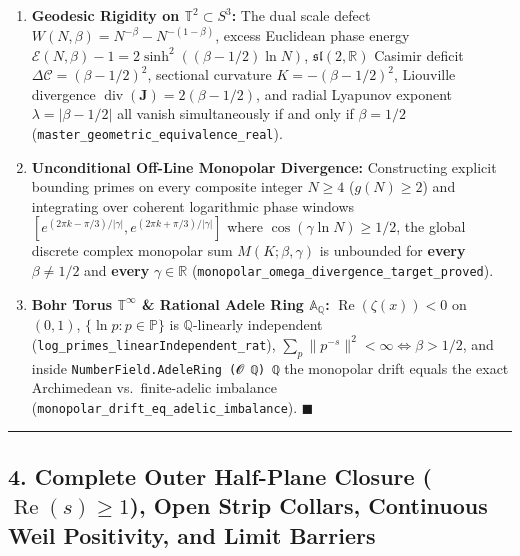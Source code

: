 \documentclass[
  11pt,
]{article}
\providecommand{\tightlist}{%
  \setlength{\itemsep}{0pt}\setlength{\parskip}{0pt}}
\begin{document}
\begin{enumerate}
\def\labelenumi{\arabic{enumi}.}
\tightlist
\item
  \textbf{Geodesic Rigidity on \(\mathbb{T}^2 \subset S^3\):} The dual
  scale defect \(W(N,\beta) = N^{-\beta} - N^{-(1-\beta)}\), excess
  Euclidean phase energy
  \(\mathcal{E}(N,\beta) - 1 = 2\sinh^2((\beta-1/2)\ln N)\),
  \(\mathfrak{sl}(2,\mathbb{R})\) Casimir deficit
  \(\Delta\mathcal{C} = (\beta-1/2)^2\), sectional curvature
  \(K = -(\beta-1/2)^2\), Liouville divergence
  \(\operatorname{div}(\mathbf{J}) = 2(\beta-1/2)\), and radial Lyapunov
  exponent \(\lambda = |\beta-1/2|\) all vanish simultaneously if and
  only if \(\beta = 1/2\)
  (\texttt{master\_geometric\_equivalence\_real}).
\item
  \textbf{Unconditional Off-Line Monopolar Divergence:} Constructing
  explicit bounding primes on every composite integer \(N \ge 4\)
  (\(g(N) \ge 2\)) and integrating over coherent logarithmic phase
  windows
  \([e^{(2\pi k - \pi/3)/|\gamma|}, e^{(2\pi k + \pi/3)/|\gamma|}]\)
  where \(\cos(\gamma\ln N) \ge 1/2\), the global discrete complex
  monopolar sum \(M(K; \beta, \gamma)\) is unbounded for \textbf{every}
  \(\beta \neq 1/2\) and \textbf{every} \(\gamma \in \mathbb{R}\)
  (\texttt{monopolar\_omega\_divergence\_target\_proved}).
\item
  \textbf{Bohr Torus \(\mathbb{T}^\infty\) \& Rational Adele Ring
  \(\mathbb{A}_\mathbb{Q}\):} \(\operatorname{Re}(\zeta(x)) < 0\) on
  \((0,1)\), \(\{\ln p : p \in \mathbb{P}\}\) is \(\mathbb{Q}\)-linearly
  independent (\texttt{log\_primes\_linearIndependent\_rat}),
  \(\sum_p \|p^{-s}\|^2 < \infty \iff \beta > 1/2\), and inside
  \texttt{NumberField.AdeleRing\ (𝓞\ ℚ)\ ℚ} the monopolar drift equals
  the exact Archimedean vs.~finite-adelic imbalance
  (\texttt{monopolar\_drift\_eq\_adelic\_imbalance}). \(\blacksquare\)
\end{enumerate}

\begin{center}\rule{0.5\linewidth}{0.5pt}\end{center}

\subsection{\texorpdfstring{4. Complete Outer Half-Plane Closure
(\(\operatorname{Re}(s) \ge 1\)), Open Strip Collars, Continuous Weil
Positivity, and Limit
Barriers}{4. Complete Outer Half-Plane Closure (\textbackslash operatorname\{Re\}(s) \textbackslash ge 1), Open Strip Collars, Continuous Weil Positivity, and Limit Barriers}}\label{complete-outer-half-plane-closure-operatornameres-ge-1-open-strip-collars-continuous-weil-positivity-and-limit-barriers}
\end{document}
